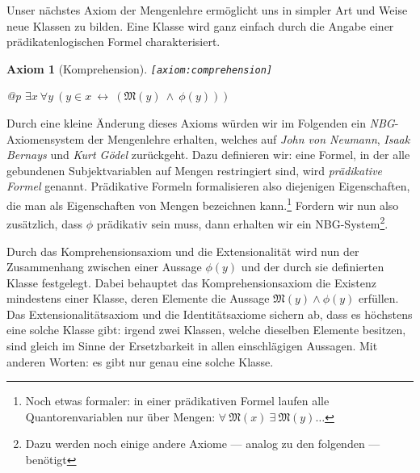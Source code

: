 \documentclass[a4paper,german,10pt,twoside]{book}
\newtheorem{ax}{Axiom}
\theoremstyle{definition}
\theoremstyle{remark}
\begin{document}
\par
Unser n{\"a}chstes Axiom der Mengenlehre erm{\"o}glicht uns in simpler Art und Weise neue Klassen zu bilden. Eine Klasse wird ganz einfach durch die Angabe einer pr{\"a}dikatenlogischen Formel charakterisiert.

\begin{ax}[Komprehension]
\label{axiom:comprehension} \hypertarget{axiom:comprehension}{}
{\tt \tiny [\verb]axiom:comprehension]]}
\mbox{}
\begin{longtable}{{@{\extracolsep{\fill}}p{\linewidth}}}
\centering $\exists x\ \forall y\ (y \in x\ \leftrightarrow\ (\mathfrak{M}(y)\ \land\ \phi(y)))$
\end{longtable}

\end{ax}

Durch eine kleine {\"A}nderung dieses Axioms w{\"u}rden wir im Folgenden ein \emph{NBG}-Axiomensystem der Mengenlehre erhalten, welches auf \emph{John von Neumann}, \emph{Isaak Bernays} und \emph{Kurt G{\"o}del} zur{\"u}ckgeht.
Dazu definieren wir: eine Formel, in der alle gebundenen Subjektvariablen auf Mengen restringiert sind, wird \emph{pr{\"a}dikative Formel} genannt. Pr{\"a}dikative Formeln formalisieren also diejenigen Eigenschaften, die man als {\glqq Eigenschaften von Mengen\grqq} bezeichnen kann.\footnote{Noch etwas formaler: in einer pr{\"a}dikativen Formel laufen alle Quantorenvariablen nur {\"u}ber Mengen: $\forall \ \mathfrak{M}(x) \ \exists \ \mathfrak{M}(y) \ldots$}
Fordern wir nun also zus{\"a}tzlich, dass $\phi$ pr{\"a}dikativ sein muss, dann erhalten wir ein NBG-System\footnote{Dazu werden noch einige andere Axiome --- analog zu den folgenden --- ben{\"o}tigt}.


\par
Durch das Komprehensionsaxiom und die Extensionalit{\"a}t wird nun der Zusammenhang zwischen einer Aussage $\phi(y)$ und der durch sie definierten Klasse festgelegt. Dabei behauptet das Komprehensionsaxiom die Existenz mindestens einer Klasse, deren Elemente die Aussage $\mathfrak{M}(y) \land \phi(y)$ erf{\"u}llen. Das Extensionalit{\"a}tsaxiom und die Identit{\"a}tsaxiome sichern ab, dass es h{\"o}chstens eine solche Klasse gibt: irgend zwei Klassen, welche dieselben Elemente besitzen, sind gleich im Sinne der Ersetzbarkeit in allen einschl{\"a}gigen Aussagen. Mit anderen Worten: es gibt nur genau eine solche Klasse.
\end{document}
